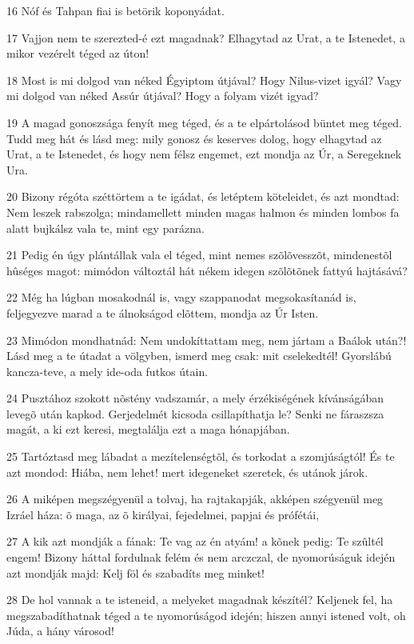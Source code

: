 \par 16 Nóf és Tahpan fiai is betörik koponyádat.
\par 17 Vajjon nem te szerezted-é ezt magadnak? Elhagytad az Urat, a te Istenedet, a mikor vezérelt téged az úton!
\par 18 Most is mi dolgod van néked Égyiptom útjával? Hogy Nilus-vizet igyál? Vagy mi dolgod van néked Assúr útjával? Hogy a folyam vizét igyad?
\par 19 A magad gonoszsága fenyít meg téged, és a te elpártolásod büntet meg téged. Tudd meg hát és lásd meg: mily gonosz és keserves dolog, hogy elhagytad az Urat, a te Istenedet, és hogy nem félsz engemet, ezt mondja az Úr, a Seregeknek Ura.
\par 20 Bizony régóta széttörtem a te igádat, és letéptem köteleidet, és azt mondtad: Nem leszek rabszolga; mindamellett minden magas halmon és minden lombos fa alatt bujkálsz vala te, mint egy parázna.
\par 21 Pedig én úgy plántállak vala el téged, mint nemes szõlõvesszõt, mindenestõl hûséges magot: mimódon változtál hát nékem idegen  szõlõtõnek fattyú hajtásává?
\par 22 Még ha lúgban mosakodnál is, vagy szappanodat megsokasítanád is, feljegyezve marad a te álnokságod elõttem, mondja az Úr Isten.
\par 23 Mimódon mondhatnád: Nem undokíttattam meg, nem jártam a Baálok után?! Lásd meg a te útadat a völgyben, ismerd meg csak: mit cselekedtél! Gyorslábú kancza-teve, a mely ide-oda futkos útain.
\par 24 Pusztához szokott nõstény vadszamár, a mely érzékiségének kívánságában levegõ után kapkod. Gerjedelmét kicsoda csillapíthatja le? Senki ne fáraszsza magát, a ki ezt keresi, megtalálja ezt a maga hónapjában.
\par 25 Tartóztasd meg lábadat a mezítelenségtõl, és torkodat a szomjúságtól! És te azt mondod: Hiába, nem lehet! mert idegeneket szeretek, és utánok járok.
\par 26 A miképen megszégyenül a tolvaj, ha rajtakapják, akképen szégyenül meg Izráel háza: õ maga, az õ királyai, fejedelmei, papjai és prófétái,
\par 27 A kik azt mondják a fának: Te vag az én atyám! a kõnek pedig: Te szûltél engem! Bizony háttal fordulnak felém és nem arczczal, de nyomorúságuk idején azt mondják majd: Kelj föl és szabadíts meg minket!
\par 28 De hol vannak a te isteneid, a melyeket magadnak készítél? Keljenek fel, ha megszabadíthatnak téged a te nyomorúságod idején; hiszen annyi istened volt, oh Júda, a hány városod!
